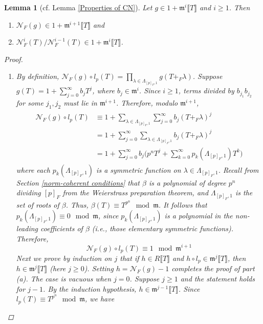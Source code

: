 \documentclass[12pt]{article}
\newtheorem{lemma}[theorem]{Lemma}
\theoremstyle{definition}
\newcommand{\PS}[1]{\llbracket #1 \rrbracket}
\def\CN{\mathscr{N}}
\def\m{\mathfrak{m}}
\begin{document}
    \begin{lemma} [{{cf. Lemma \ref{Properties of CN}}}] \label{generalized properties of CN}
        Let $g \in 1 + \m^i\PS{T}$ and $i \geqslant 1$. Then 
        \begin{enumerate}
            \item [(a)] $\CN_F(g) \in 1 + \m^{i+1}\PS{T}$ and 
            \item [(b)] $\CN_F^i(T)/\CN_F^{i-1}(T) \in 1 + \m^i\PS{T}$. 
        \end{enumerate}
        \begin{proof}
            \begin{enumerate}
                \item [(a)] By definition, $\CN_F(g) \circ l_p(T) = \prod_{\lambda \in \Lambda_{[p]_F,1}} g(T +_F \lambda)$. Suppose $g(T) = 1 + \sum_{j=0}^\infty b_j T^j$, where $b_j \in \m^i$. Since $i \geqslant 1$, terms divided by $b_{j_1}b_{j_2}$ for some $j_1,j_2$ must lie in $\m^{i+1}$. Therefore, modulo $\m^{i+1}$, 
                \begin{align*}
                    \begin{split}
                        \CN_F(g) \circ l_p(T) &\equiv 1 + \sum_{\lambda \in \Lambda_{[p]_F,1}} \sum_{j=0}^\infty b_j(T +_F \lambda)^j \\ 
                        &= 1 + \sum_{j=0}^\infty\sum_{\lambda \in \Lambda_{[p]_F,1}} b_j(T +_F \lambda)^j \\ 
                        &= 1 + \sum_{j=0}^\infty b_j\bigl(p^nT^j + \sum_{k=0}^\infty p_k(\Lambda_{[p]_F,1})T^k\bigr) 
                    \end{split}
                \end{align*}
                where each $p_k(\Lambda_{[p]_F,1})$ is a symmetric function on $\lambda \in \Lambda_{[p]_F,1}$. Recall from Section \ref{norm-coherent conditions} that $\beta$ is a polynomial of degree $p^n$ dividing $[p]_F$ from the Weierstrass preparation theorem, and $\Lambda_{[p]_F,1}$ is the set of roots of $\beta$. Thus, $\beta(T) \equiv T^{p^n} \mod{\m}$. It follows that $p_k(\Lambda_{[p]_F,1}) \equiv 0 \mod{\m}$, since $p_k(\Lambda_{[p]_F,1})$ is a polynomial in the non-leading coefficients of $\beta$ (i.e., those elementary symmetric functions). Therefore, 
                \begin{equation*}
                    \CN_F(g) \circ l_p(T) \equiv 1 \mod{\m^{i+1}}
                \end{equation*}
                Next we prove by induction on $j$ that if $h \in R\PS{T}$ and $h \circ l_p \in \m^j\PS{T}$, then $h \in \m^j\PS{T}$ (here $j \geqslant 0$). Setting $h = \CN_F(g) - 1$ completes the proof of part (a). The case is vacuous when $j = 0$. Suppose $j \geqslant 1$ and the statement holds for $j - 1$. By the induction hypothesis, $h \in \m^{j-1}\PS{T}$. Since $l_p(T) \equiv T^{p^n} \mod{\m}$, we have 

\end{enumerate}
\end{proof}
\end{lemma}
\end{document}
